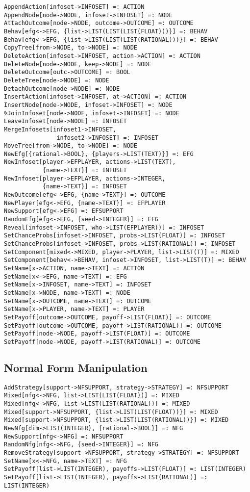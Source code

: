 \begin{verbatim}
AppendAction[infoset->INFOSET] =: ACTION
AppendNode[node->NODE, infoset->INFOSET] =: NODE
AttachOutcome[node->NODE, outcome->OUTCOME] =: OUTCOME
Behav[efg<->EFG, {list->LIST(LIST(LIST(FLOAT)))}] =: BEHAV
Behav[efg<->EFG, {list->LIST(LIST(LIST(RATIONAL)))}] =: BEHAV
CopyTree[from->NODE, to->NODE] =: NODE
DeleteAction[infoset->INFOSET, action->ACTION] =: ACTION
DeleteNode[node->NODE, keep->NODE] =: NODE
DeleteOutcome[outc->OUTCOME] =: BOOL
DeleteTree[node->NODE] =: NODE
DetachOutcome[node->NODE] =: NODE
InsertAction[infoset->INFOSET, at->ACTION] =: ACTION
InsertNode[node->NODE, infoset->INFOSET] =: NODE
%JoinInfoset[node->NODE, infoset->INFOSET] =: NODE
LeaveInfoset[node->NODE] =: INFOSET
MergeInfosets[infoset1->INFOSET,
               infoset2->INFOSET] =: INFOSET
MoveTree[from->NODE, to->NODE] =: NODE
NewEfg[{rational->BOOL}, {players->LIST(TEXT)}] =: EFG
NewInfoset[player->EFPLAYER, actions->LIST(TEXT),
           {name->TEXT}] =: INFOSET
NewInfoset[player->EFPLAYER, actions->INTEGER,
           {name->TEXT}] =: INFOSET
NewOutcome[efg<->EFG, {name->TEXT}] =: OUTCOME
NewPlayer[efg<->EFG, {name->TEXT}] =: EFPLAYER 
NewSupport[efg<->EFG] =: EFSUPPORT
RandomEfg[efg<->EFG, {seed->INTEGER}] =: EFG
Reveal[infoset->INFOSET, who->LIST(EFPLAYER))] =: INFOSET
SetChanceProbs[infoset->INFOSET, probs->LIST(FLOAT)] =: INFOSET
SetChanceProbs[infoset->INFOSET, probs->LIST(RATIONAL)] =: INFOSET
SetComponent[mixed<->MIXED, player->PLAYER, list->LIST(T)] =: MIXED 
SetComponent[behav<->BEHAV, infoset->INFOSET, list->LIST(T)] =: BEHAV 
SetName[x->ACTION, name->TEXT] =: ACTION
SetName[x<->EFG, name->TEXT] =: EFG
SetName[x->INFOSET, name->TEXT] =: INFOSET
SetName[x->NODE, name->TEXT] =: NODE
SetName[x->OUTCOME, name->TEXT] =: OUTCOME
SetName[x->PLAYER, name->TEXT] =: PLAYER
SetPayoff[outcome->OUTCOME, payoff->LIST(FLOAT)] =: OUTCOME
SetPayoff[outcome->OUTCOME, payoff->LIST(RATIONAL)] =: OUTCOME
SetPayoff[node->NODE, payoff->LIST(FLOAT)] =: OUTCOME
SetPayoff[node->NODE, payoff->LIST(RATIONAL)] =: OUTCOME
\end{verbatim}

\subsection{Normal Form Manipulation}

\begin{verbatim}
AddStrategy[support->NFSUPPORT, strategy->STRATEGY] =: NFSUPPORT
Mixed[nfg<->NFG, list->LIST(LIST(FLOAT))] =: MIXED
Mixed[nfg<->NFG, list->LIST(LIST(RATIONAL))] =: MIXED
Mixed[support->NFSUPPORT, {list->LIST(LIST(FLOAT))}] =: MIXED
Mixed[support->NFSUPPORT, {list->LIST(LIST(RATIONAL))}] =: MIXED
NewNfg[dim->LIST(INTEGER), {rational->BOOL}] =: NFG
NewSupport[nfg<->NFG] =: NFSUPPORT
RandomNfg[nfg<->NFG, {seed->INTEGER}] =: NFG
RemoveStrategy[support->NFSUPPORT, strategy->STRATEGY] =: NFSUPPORT
SetName[x<->NFG, name->TEXT] =: NFG
SetPayoff[list->LIST(INTEGER), payoffs->LIST(FLOAT)] =: LIST(INTEGER)
SetPayoff[list->LIST(INTEGER), payoffs->LIST(RATIONAL)] =: LIST(INTEGER)
\end{verbatim}

